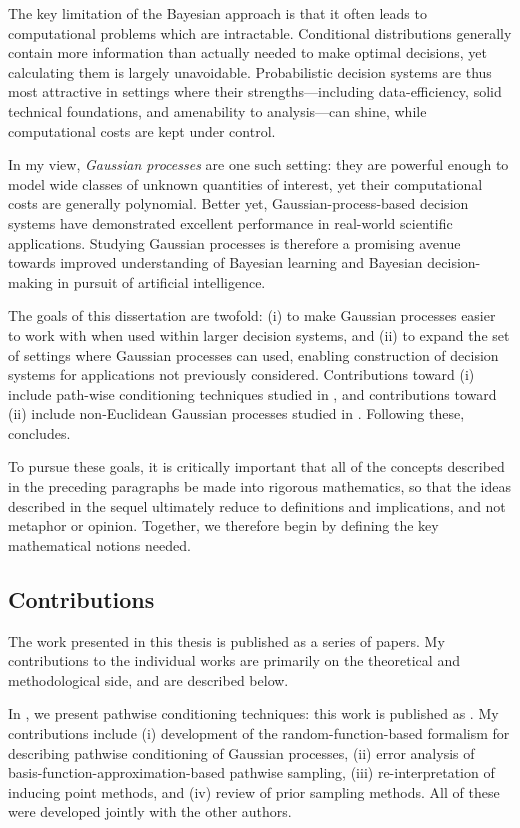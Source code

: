 \documentclass[11pt]{book}
\begin{document}
The key limitation of the Bayesian approach is that it often leads to computational problems which are intractable.
Conditional distributions generally contain more information than actually needed to make optimal decisions, yet calculating them is largely unavoidable.
Probabilistic decision systems are thus most attractive in settings where their strengths---including data-efficiency, solid technical foundations, and amenability to analysis---can shine, while computational costs are kept under control.

In my view, \emph{Gaussian processes} are one such setting: they are powerful enough to model wide classes of unknown quantities of interest, yet their computational costs are generally polynomial.
Better yet, Gaussian-process-based decision systems have demonstrated excellent performance in real-world scientific applications.
Studying Gaussian processes is therefore a promising avenue towards improved understanding of Bayesian learning and Bayesian decision-making in pursuit of artificial intelligence.

The goals of this dissertation are twofold: (i) to make Gaussian processes easier to work with when used within larger decision systems, and (ii) to expand the set of settings where Gaussian processes can used, enabling construction of decision systems for applications not previously considered.
Contributions toward (i) include path-wise conditioning techniques studied in , and contributions toward (ii) include non-Euclidean Gaussian processes studied in .
Following these,  concludes.

To pursue these goals, it is critically important that all of the concepts described in the preceding paragraphs be made into rigorous mathematics, so that the ideas described in the sequel ultimately reduce to definitions and implications, and not metaphor or opinion.
Together, we therefore begin by defining the key mathematical notions needed.

\subsection*{Contributions}

The work presented in this thesis is published as a series of papers.
My contributions to the individual works are primarily on the theoretical and methodological side, and are described below.

In , we present pathwise conditioning techniques: this work is published as \textcite{wilson20,wilson21}.
My contributions include (i) development of the random-function-based formalism for describing pathwise conditioning of Gaussian processes, (ii) error analysis of basis-function-approximation-based pathwise sampling, (iii) re-interpretation of inducing point methods, and (iv) review of prior sampling methods.
All of these were developed jointly with the other authors. 
\end{document}
